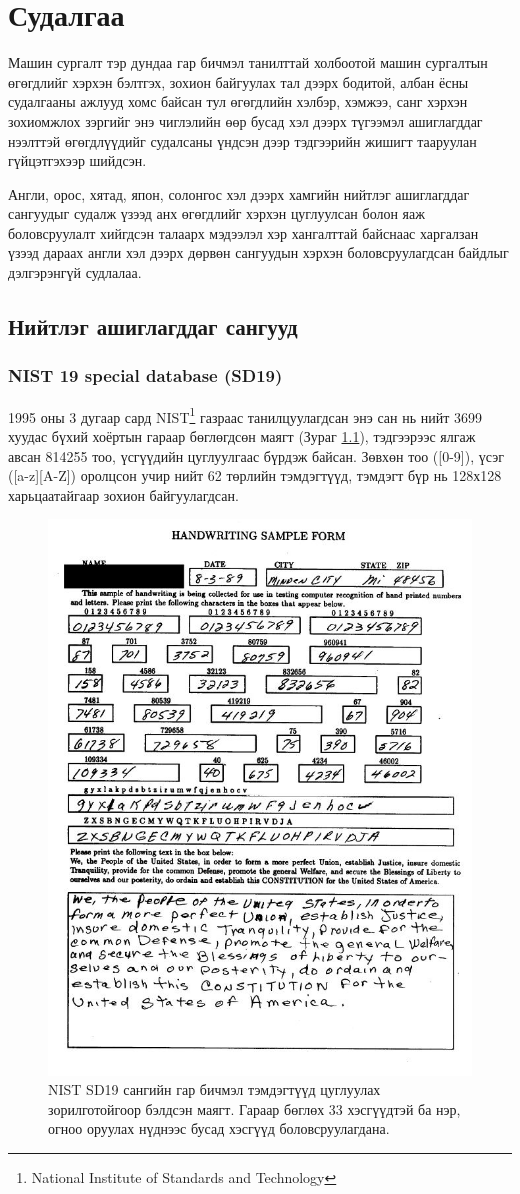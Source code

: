 \chapter{Судалгаа}

Машин сургалт тэр дундаа гар бичмэл танилттай холбоотой машин сургалтын өгөгдлийг хэрхэн бэлтгэх, зохион байгуулах тал дээрх бодитой, албан ёсны судалгааны ажлууд хомс байсан тул өгөгдлийн хэлбэр, хэмжээ, санг хэрхэн зохиомжлох зэргийг энэ чиглэлийн өөр бусад хэл дээрх түгээмэл ашиглагддаг нээлттэй өгөгдлүүдийг судалсаны үндсэн дээр тэдгээрийн жишигт тааруулан гүйцэтгэхээр шийдсэн.

Англи, орос, хятад, япон, солонгос хэл дээрх хамгийн нийтлэг ашиглагддаг сангуудыг судалж үзээд анх өгөгдлийг хэрхэн цуглуулсан болон яаж боловсруулалт хийгдсэн талаарх мэдээлэл хэр хангалттай байснаас харгалзан үзээд дараах англи хэл дээрх дөрвөн сангуудын хэрхэн боловсруулагдсан байдлыг дэлгэрэнгүй судлалаа.

\section{Нийтлэг ашиглагддаг сангууд}

\subsection{NIST 19 special database (SD19)}

1995 оны 3 дугаар сард NIST\footnote{National Institute of Standards and Technology} газраас танилцуулагдсан энэ сан нь нийт 3699 хуудас бүхий хоёртын гараар бөглөгдсөн маягт (Зураг \ref{fig:sd19}), тэдгээрээс ялгаж авсан 814255 тоо, үсгүүдийн цуглуулгаас бүрдэж байсан. Зөвхөн тоо ([0-9]), үсэг ([a-z][A-Z]) оролцсон учир нийт 62 төрлийн тэмдэгтүүд, тэмдэгт бүр нь 128х128 харьцаатайгаар зохион байгуулагдсан. \cite{nist19}

\begin{figure}[H]
	\centering
	\includegraphics[width=0.6\linewidth]{images/sd19}
	\caption{NIST SD19 сангийн гар бичмэл тэмдэгтүүд цуглуулах зорилготойгоор бэлдсэн маягт. Гараар бөглөх 33 хэсгүүдтэй ба нэр, огноо оруулах нүднээс бусад хэсгүүд боловсруулагдана.}
	\label{fig:sd19}
\end{figure}

